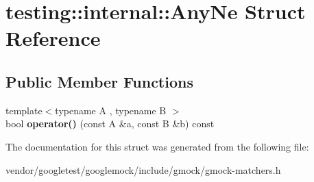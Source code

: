 \hypertarget{structtesting_1_1internal_1_1_any_ne}{}\section{testing\+:\+:internal\+:\+:Any\+Ne Struct Reference}
\label{structtesting_1_1internal_1_1_any_ne}
\subsection*{Public Member Functions}
\begin{DoxyCompactItemize}
\item 
\mbox{\label{structtesting_1_1internal_1_1_any_ne_a9f50f8ede12e394c6bc64bad05e94742}} 
{\footnotesize template$<$typename A , typename B $>$ }\\bool {\bfseries operator()} (const A \&a, const B \&b) const
\end{DoxyCompactItemize}


The documentation for this struct was generated from the following file\+:\begin{DoxyCompactItemize}
\item 
vendor/googletest/googlemock/include/gmock/gmock-\/matchers.\+h\end{DoxyCompactItemize}

